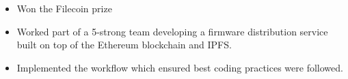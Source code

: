 \documentclass[8pt,a4paper]{altacv}
\begin{document}
\begin{itemize}
\item Won the Filecoin prize
\item Worked part of a 5-strong team developing a firmware distribution service built on top of the Ethereum blockchain and IPFS.
\item Implemented the workflow which ensured best coding practices were followed. 
\end{itemize}
\divider
\end{document}

